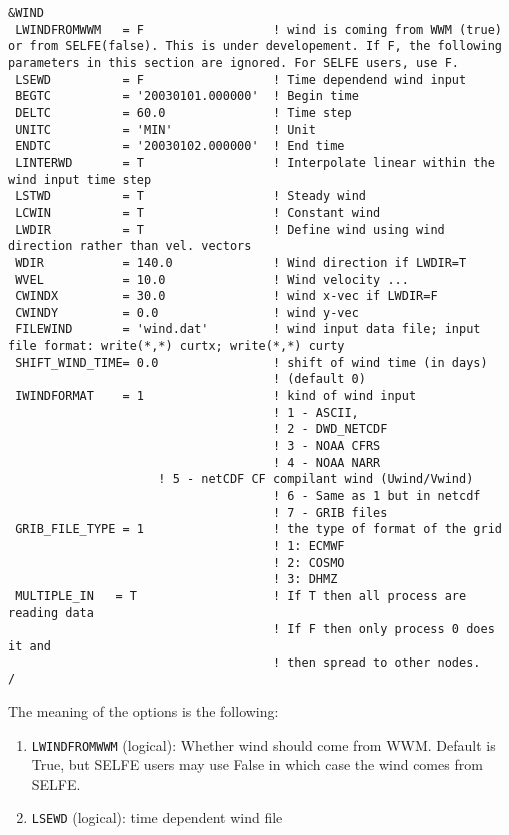 \documentclass[12pt]{amsart}
\begin{document}
\begin{verbatim}
&WIND
 LWINDFROMWWM   = F                  ! wind is coming from WWM (true) or from SELFE(false). This is under developement. If F, the following parameters in this section are ignored. For SELFE users, use F.
 LSEWD          = F                  ! Time dependend wind input
 BEGTC          = '20030101.000000'  ! Begin time
 DELTC          = 60.0               ! Time step
 UNITC          = 'MIN'              ! Unit
 ENDTC          = '20030102.000000'  ! End time
 LINTERWD       = T                  ! Interpolate linear within the wind input time step
 LSTWD          = T                  ! Steady wind
 LCWIN          = T                  ! Constant wind
 LWDIR          = T                  ! Define wind using wind direction rather than vel. vectors
 WDIR           = 140.0              ! Wind direction if LWDIR=T
 WVEL           = 10.0               ! Wind velocity ...
 CWINDX         = 30.0               ! wind x-vec if LWDIR=F
 CWINDY         = 0.0                ! wind y-vec
 FILEWIND       = 'wind.dat'         ! wind input data file; input file format: write(*,*) curtx; write(*,*) curty
 SHIFT_WIND_TIME= 0.0                ! shift of wind time (in days)
                                     ! (default 0)
 IWINDFORMAT    = 1                  ! kind of wind input
                                     ! 1 - ASCII,
                                     ! 2 - DWD_NETCDF
                                     ! 3 - NOAA CFRS
                                     ! 4 - NOAA NARR
				     ! 5 - netCDF CF compilant wind (Uwind/Vwind)
                                     ! 6 - Same as 1 but in netcdf
                                     ! 7 - GRIB files
 GRIB_FILE_TYPE = 1                  ! the type of format of the grid
                                     ! 1: ECMWF
                                     ! 2: COSMO
                                     ! 3: DHMZ
 MULTIPLE_IN   = T                   ! If T then all process are reading data
                                     ! If F then only process 0 does it and
                                     ! then spread to other nodes.
/
\end{verbatim}
The meaning of the options is the following:
\begin{enumerate}
\item {\tt LWINDFROMWWM} (logical): Whether wind should come from WWM. Default is True, but SELFE users may use False in which case the wind comes from SELFE.
\item {\tt LSEWD} (logical): time dependent wind file

  
\end{enumerate}
\end{document}
